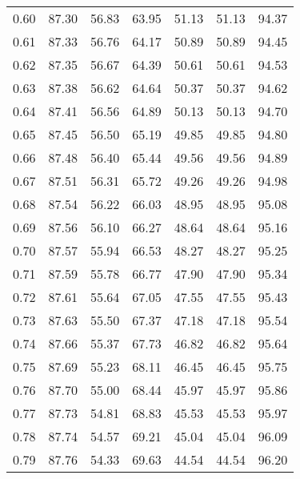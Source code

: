 \begin{tabular}{|c|c|c|c|c|c|c|}
      0.60 &     87.30 &     56.83 &      63.95 &   51.13 &      51.13 &         94.37 \\
      0.61 &     87.33 &     56.76 &      64.17 &   50.89 &      50.89 &         94.45 \\
      0.62 &     87.35 &     56.67 &      64.39 &   50.61 &      50.61 &         94.53 \\
      0.63 &     87.38 &     56.62 &      64.64 &   50.37 &      50.37 &         94.62 \\
      0.64 &     87.41 &     56.56 &      64.89 &   50.13 &      50.13 &         94.70 \\
      0.65 &     87.45 &     56.50 &      65.19 &   49.85 &      49.85 &         94.80 \\
      0.66 &     87.48 &     56.40 &      65.44 &   49.56 &      49.56 &         94.89 \\
      0.67 &     87.51 &     56.31 &      65.72 &   49.26 &      49.26 &         94.98 \\
      0.68 &     87.54 &     56.22 &      66.03 &   48.95 &      48.95 &         95.08 \\
      0.69 &     87.56 &     56.10 &      66.27 &   48.64 &      48.64 &         95.16 \\
      0.70 &     87.57 &     55.94 &      66.53 &   48.27 &      48.27 &         95.25 \\
      0.71 &     87.59 &     55.78 &      66.77 &   47.90 &      47.90 &         95.34 \\
      0.72 &     87.61 &     55.64 &      67.05 &   47.55 &      47.55 &         95.43 \\
      0.73 &     87.63 &     55.50 &      67.37 &   47.18 &      47.18 &         95.54 \\
      0.74 &     87.66 &     55.37 &      67.73 &   46.82 &      46.82 &         95.64 \\
      0.75 &     87.69 &     55.23 &      68.11 &   46.45 &      46.45 &         95.75 \\
      0.76 &     87.70 &     55.00 &      68.44 &   45.97 &      45.97 &         95.86 \\
      0.77 &     87.73 &     54.81 &      68.83 &   45.53 &      45.53 &         95.97 \\
      0.78 &     87.74 &     54.57 &      69.21 &   45.04 &      45.04 &         96.09 \\
      0.79 &     87.76 &     54.33 &      69.63 &   44.54 &      44.54 &         96.20 \\

\end{tabular}
